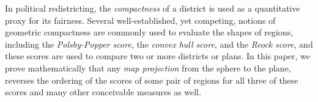 In political redistricting, the \textit{compactness} of a district is
used as a quantitative proxy for its fairness.  Several
well-established, yet competing, notions of geometric compactness are
commonly used to evaluate the shapes of regions, including the
\textit{Polsby-Popper score}, the \textit{convex hull score}, and the \textit{Reock score}, and
these scores are used to compare two or more districts or plans.  In
this paper, we prove mathematically that  any \textit{map
projection} from the sphere to the plane, reverses the ordering of the scores of some pair of regions for all three of these scores and many other conceivable measures as well.
